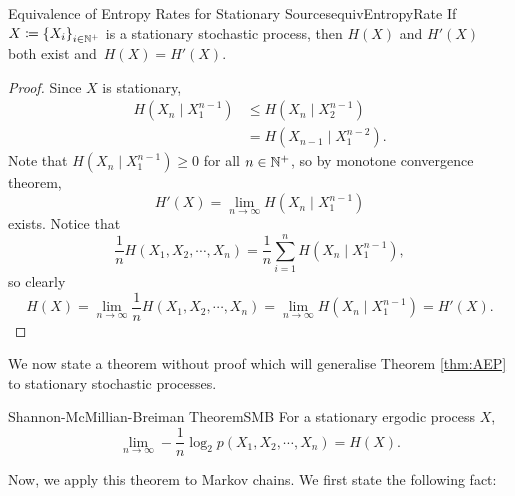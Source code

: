 \documentclass[math]{amznotes}
\theoremstyle{remark}
\begin{document}
\begin{thmbox}{Equivalence of Entropy Rates for Stationary Sources}{equivEntropyRate}
    If $X \coloneqq \left\{X_i\right\}_{i \in \mathbb{N}^+}$ is a stationary stochastic process, then $H\left(X\right)$ and $H'\left(X\right)$ both exist and~$H\left(X\right) = H'\left(X\right)$.
    \tcblower
    \begin{proof}
        Since $X$ is stationary, 
        \begin{align*}
            H\left(X_n \mid X_1^{n - 1}\right) & \leq H\left(X_n \mid X_2^{n - 1}\right) \\
            & = H\left(X_{n - 1} \mid X_1^{n - 2}\right).
        \end{align*}
        Note that $H\left(X_n \mid X_1^{n - 1}\right) \geq 0$ for all $n \in \mathbb{N}^+$, so by monotone convergence theorem, 
        \begin{equation*}
            H'\left(X\right) = \lim_{n \to \infty}H\left(X_n \mid X_1^{n - 1}\right)
        \end{equation*}
        exists. Notice that 
        \begin{equation*}
            \frac{1}{n}H\left(X_1, X_2, \cdots, X_n\right) = \frac{1}{n}\sum_{i = 1}^{n}H\left(X_n \mid X_1^{n - 1}\right),
        \end{equation*}
        so clearly 
        \begin{equation*}
            H\left(X\right) = \lim_{n \to \infty}\frac{1}{n}H\left(X_1, X_2, \cdots, X_n\right) = \lim_{n \to \infty}H\left(X_n \mid X_1^{n - 1}\right) = H'\left(X\right).
        \end{equation*}
    \end{proof}
\end{thmbox}
We now state a theorem without proof which will generalise Theorem \ref{thm:AEP} to stationary stochastic processes.
\begin{thmbox}{Shannon-McMillian-Breiman Theorem}{SMB}
    For a stationary ergodic process $X$, 
    \begin{equation*}
        \lim_{n \to \infty}-\frac{1}{n}\log_2p\left(X_1, X_2, \cdots, X_n\right) = H\left(X\right).
    \end{equation*}
\end{thmbox}
Now, we apply this theorem to Markov chains. We first state the following fact:
\end{document}
